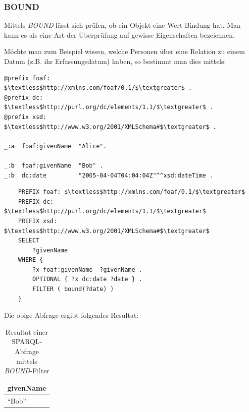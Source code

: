 \subsubsection{BOUND}
\label{subsec:sparql_ausdruecke_funktionen_bound}
Mittels \textit{BOUND} lässt sich prüfen, ob ein Objekt eine Wert-Bindung hat. Man kann es als eine Art der Überprüfung auf gewisse Eigenschaften bezeichnen.

Möchte man zum Beispiel wissen, welche Personen über eine Relation zu einem Datum (z.B. ihr Erfassungsdatum) haben, so bestimmt man dies mittels:
\begin{lstlisting}
@prefix foaf:        $\textless$http://xmlns.com/foaf/0.1/$\textgreater$ .
@prefix dc:          $\textless$http://purl.org/dc/elements/1.1/$\textgreater$ .
@prefix xsd:          $\textless$http://www.w3.org/2001/XMLSchema#$\textgreater$ .

_:a  foaf:givenName  "Alice".

_:b  foaf:givenName  "Bob" .
_:b  dc:date         "2005-04-04T04:04:04Z"^^xsd:dateTime .
\end{lstlisting}

\begin{lstlisting}
    PREFIX foaf: $\textless$http://xmlns.com/foaf/0.1/$\textgreater$
    PREFIX dc:   $\textless$http://purl.org/dc/elements/1.1/$\textgreater$
    PREFIX xsd:   $\textless$http://www.w3.org/2001/XMLSchema#$\textgreater$
    SELECT
        ?givenName
    WHERE {
        ?x foaf:givenName  ?givenName .
        OPTIONAL { ?x dc:date ?date } .
        FILTER ( bound(?date) )
    }
\end{lstlisting}

Die obige Abfrage ergibt folgendes Resultat:
\noindent\hspace*{15mm}
\begin{table}[h]
    \centering
    \begin{tabular}{|l|}
        \hline
        \multicolumn{1}{|c|}{\textbf{givenName}} \\ \hline
        ``Bob''                    \\ \hline
    \end{tabular}
    \caption{Resultat einer SPARQL-Abfrage mittels \textit{BOUND}-Filter\protect\footnotemark}
\end{table}

